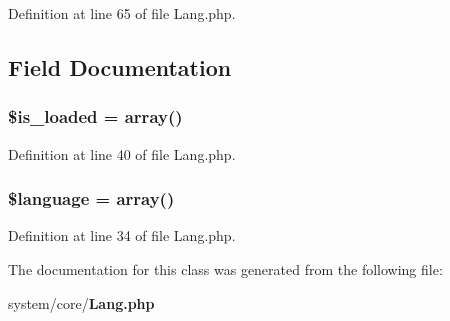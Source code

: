 Definition at line 65 of file Lang.\-php.



\subsection{Field Documentation}
\subsubsection[{\$is\-\_\-loaded}]{\setlength{\rightskip}{0pt plus 5cm}\$is\-\_\-loaded = array()}\label{class_c_i___lang_a908e9ad52a5d1956d360689452f6bdbe}


Definition at line 40 of file Lang.\-php.

\subsubsection[{\$language}]{\setlength{\rightskip}{0pt plus 5cm}\$language = array()}\label{class_c_i___lang_a83170d318260a5a2e2a79dccdd371b10}


Definition at line 34 of file Lang.\-php.



The documentation for this class was generated from the following file\-:\begin{DoxyCompactItemize}
\item 
system/core/{\bf Lang.\-php}\end{DoxyCompactItemize}
